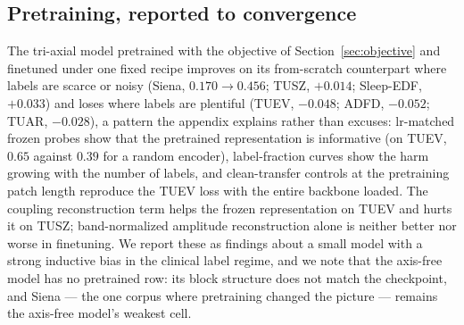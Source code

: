 \subsection{Pretraining, reported to convergence}
\label{sec:pretrain-results}

The tri-axial model pretrained with the objective of
Section~\ref{sec:objective} and finetuned under one fixed recipe improves
on its from-scratch counterpart where labels are scarce or noisy (Siena,
$0.170 \to 0.456$; TUSZ, $+0.014$; Sleep-EDF, $+0.033$) and loses where
labels are plentiful (TUEV, $-0.048$; ADFD, $-0.052$; TUAR, $-0.028$), a
pattern the appendix explains rather than excuses: lr-matched frozen
probes show that the pretrained representation is informative (on TUEV,
$0.65$ against $0.39$ for a random encoder), label-fraction curves show
the harm growing with the number of labels, and clean-transfer controls at
the pretraining patch length reproduce the TUEV loss with the entire
backbone loaded. The coupling reconstruction term helps the frozen
representation on TUEV and hurts it on TUSZ; band-normalized amplitude
reconstruction alone \citep{yu2026understanding} is neither better nor
worse in finetuning. We report these as findings about a small model with
a strong inductive bias in the clinical label regime, and we note that the
axis-free model has no pretrained row: its block structure does not match
the checkpoint, and Siena --- the one corpus where pretraining changed the
picture --- remains the axis-free model's weakest cell.
